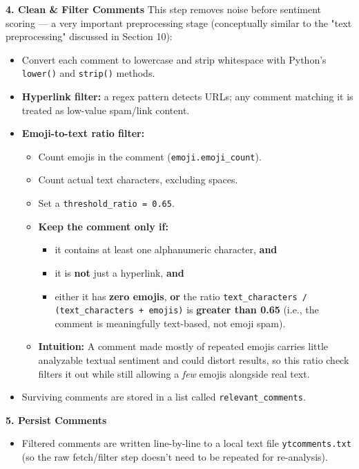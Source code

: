 \documentclass[12pt,openany]{book}
\begin{document}
\textbf{4. Clean \& Filter Comments}
This step removes noise before sentiment scoring --- a very important preprocessing stage (conceptually similar to the "text preprocessing" discussed in Section 10):

\begin{itemize}[leftmargin=*]
    \item Convert each comment to lowercase and strip whitespace with Python's \texttt{lower()} and \texttt{strip()} methods.
    \item \textbf{Hyperlink filter:} a regex pattern detects URLs; any comment matching it is treated as low-value spam/link content.
    \item \textbf{Emoji-to-text ratio filter:}
    \begin{itemize}[leftmargin=*]
        \item Count emojis in the comment (\texttt{emoji.emoji\_count}).
        \item Count actual text characters, excluding spaces.
        \item Set a \texttt{threshold\_ratio = 0.65}.
        \item \textbf{Keep the comment only if:}
        \begin{itemize}[leftmargin=*]
            \item it contains at least one alphanumeric character, \textbf{and}
            \item it is \textbf{not} just a hyperlink, \textbf{and}
            \item either it has \textbf{zero emojis}, \textbf{or} the ratio \texttt{text\_characters / (text\_characters + emojis)} is \textbf{greater than 0.65} (i.e., the comment is meaningfully text-based, not emoji spam).
        \end{itemize}
        \item \textbf{Intuition:} A comment made mostly of repeated emojis carries little analyzable textual sentiment and could distort results, so this ratio check filters it out while still allowing a \textit{few} emojis alongside real text.
    \end{itemize}
    \item Surviving comments are stored in a list called \texttt{relevant\_comments}.
\end{itemize}

\textbf{5. Persist Comments}
\begin{itemize}[leftmargin=*]
    \item Filtered comments are written line-by-line to a local text file \texttt{ytcomments.txt} (so the raw fetch/filter step doesn't need to be repeated for re-analysis).
\end{itemize}
\end{document}
